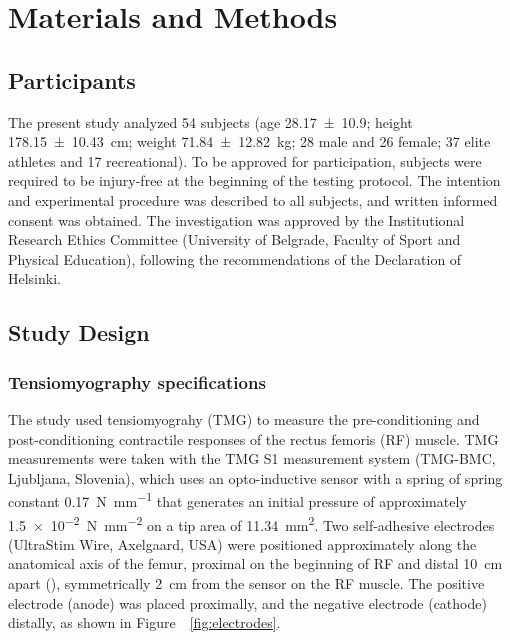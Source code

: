 \documentclass[utf8]{FrontiersinHarvard}
\begin{document}
\section{Materials and Methods}
\subsection{Participants}
The present study analyzed 54 subjects (age \SI{28.17 \pm 10.9}{\year}; height \SI{178.15 \pm 10.43}{\centi \meter}; weight \SI{71.84 \pm 12.82}{\kilogram}; 28 male and 26 female; 37 elite athletes and 17 recreational).
To be approved for participation, subjects were required to be injury-free at the beginning of the testing protocol.
The intention and experimental procedure was described to all subjects, and written informed consent was obtained.
The investigation was approved by the Institutional Research Ethics Committee (University of Belgrade, Faculty of Sport and Physical Education), following the recommendations of the Declaration of Helsinki.

\subsection{Study Design}

\subsubsection{Tensiomyography specifications}
The study used tensiomyograhy (TMG) to measure the pre-conditioning and post-conditioning contractile responses of the rectus femoris (RF) muscle.
TMG measurements were taken with the TMG S1 measurement system (TMG-BMC, Ljubljana, Slovenia), which uses an opto-inductive sensor with a spring of spring constant \SI{0.17}{\newton \per \milli \meter} that generates an initial pressure of approximately \SI{1.5e-2}{\newton \per \milli \meter \squared} on a tip area of \SI{11.34}{\milli \meter \squared}.
Two self-adhesive electrodes (UltraStim\textregistered{} Wire, Axelgaard, USA) were positioned approximately along the anatomical axis of the femur, proximal on the beginning of RF and distal \SI{10}{\centi \meter} apart (\cite{maffulietti}), symmetrically \SI{2}{\centi \meter} from the sensor on the RF muscle.
The positive electrode (anode) was placed proximally, and the negative electrode (cathode) distally, as shown in Figure~~\ref{fig:electrodes}.
\end{document}
